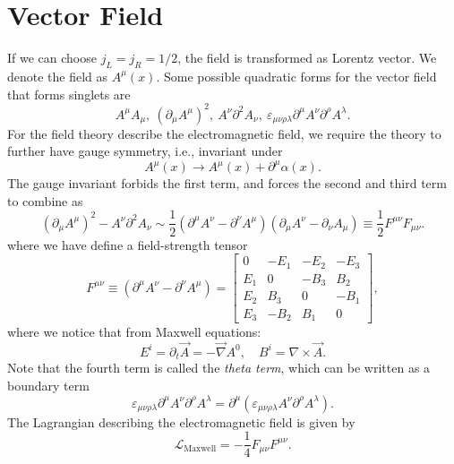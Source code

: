 \section{Vector Field}
If we can choose $j_L=j_R=1/2$, the field is transformed as Lorentz vector.
We denote the field as $A^\mu(x)$.
Some possible quadratic forms for the vector field that forms singlets are
\begin{equation}
	A^\mu A_\mu,\ (\partial_\mu A^\mu)^2,\ A^\nu \partial^2 A_\nu,\ 
	\varepsilon_{\mu\nu\rho\lambda} \partial^\mu A^\nu \partial^\rho A^\lambda.
\end{equation}
For the field theory describe the electromagnetic field, we require the theory to further have gauge symmetry, i.e., invariant under
\begin{equation}
	A^\mu(x) \rightarrow A^\mu(x) + \partial^\mu \alpha(x).
\end{equation}
The gauge invariant forbids the first term, and forces the second and third term to combine as
\begin{equation*}
	(\partial_\mu A^\mu)^2 - A^\nu \partial^2 A_\nu
	\sim \frac{1}{2}(\partial^\mu A^\nu - \partial^\nu A^\mu)(\partial_\mu A^\nu-\partial_\nu A_\mu)
	\equiv \frac{1}{2} F^{\mu\nu}F_{\mu\nu}.
\end{equation*}
where we have define a field-strength tensor
\begin{equation}
	F^{\mu\nu}\equiv (\partial^\mu A^\nu - \partial^\nu A^\mu)
	= \left[\begin{array}{cccc}
		0 & -E_1 & -E_2 & -E_3 \\
		E_1 & 0 & -B_3 & B_2 \\
		E_2 & B_3 & 0 & -B_1 \\
		E_3 & -B_2 & B_1 & 0
	\end{array} \right],
\end{equation}
where we notice that from Maxwell equations:
\begin{equation}
	E^i = \partial_t \vec A = -\vec\nabla A^0, \quad B^i = \nabla \times \vec A.
\end{equation}
Note that the fourth term is called the \textit{theta term}, which can be written as a boundary term
\begin{equation}
	\varepsilon_{\mu\nu\rho\lambda} \partial^\mu A^\nu \partial^\rho A^\lambda
	= \partial^\mu (\varepsilon_{\mu\nu\rho\lambda} A^\nu \partial^\rho A^\lambda).
\end{equation}
The Lagrangian describing the electromagnetic field is given by
\begin{equation}
	\mathcal{L}_{\mathrm{Maxwell}} = -\frac{1}{4}F_{\mu\nu}F^{\mu\nu}.
\end{equation}

